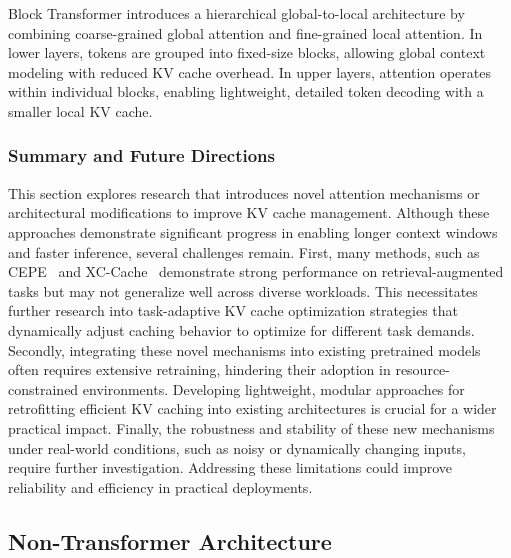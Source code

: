 Block Transformer \cite{hoBlockTransformerGlobaltoLocal2024} introduces a hierarchical global-to-local architecture by combining coarse-grained global attention and fine-grained local attention. In lower layers, tokens are grouped into fixed-size blocks, allowing global context modeling with reduced KV cache overhead. In upper layers, attention operates within individual blocks, enabling lightweight, detailed token decoding with a smaller local KV cache.

\subsubsection{Summary and Future Directions} 
This section explores research that introduces novel attention mechanisms or architectural modifications to improve KV cache management. Although these approaches demonstrate significant progress in enabling longer context windows and faster inference, several challenges remain. First, many methods, such as CEPE~\cite{yenLongContextLanguageModeling2024a} and XC-Cache~\cite{monteiroXCCacheCrossAttendingCached2024} demonstrate strong performance on retrieval-augmented tasks but may not generalize well across diverse workloads. This necessitates further research into task-adaptive KV cache optimization strategies that dynamically adjust caching behavior to optimize for different task demands. Secondly, integrating these novel mechanisms into existing pretrained models often requires extensive retraining, hindering their adoption in resource-constrained environments. Developing lightweight, modular approaches for retrofitting efficient KV caching into existing architectures is crucial for a wider practical impact. Finally, the robustness and stability of these new mechanisms under real-world conditions, such as noisy or dynamically changing inputs, require further investigation. Addressing these limitations could improve reliability and efficiency in practical deployments.



\subsection{Non-Transformer Architecture}\label{sec:model_nontrans}


